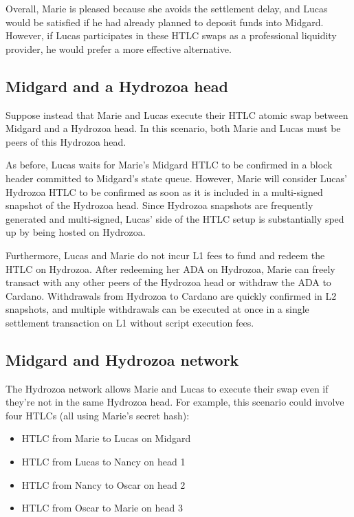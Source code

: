 \documentclass[11pt,a4paper,oneside]{article}
\begin{document}
\begin{multicols}{2}
Overall, Marie is pleased because she avoids the settlement delay, and Lucas would be satisfied if he had already planned to deposit funds into Midgard.
However, if Lucas participates in these HTLC swaps as a professional liquidity provider, he would prefer a more effective alternative.

\subsection{Midgard and a Hydrozoa head}%
\label{h:midgard-and-hydrozoa-head}

Suppose instead that Marie and Lucas execute their HTLC atomic swap between Midgard and a Hydrozoa head.
In this scenario, both Marie and Lucas must be peers of this Hydrozoa head.

As before, Lucas waits for Marie's Midgard HTLC to be confirmed in a block header committed to Midgard's state queue.
However, Marie will consider Lucas' Hydrozoa HTLC to be confirmed as soon as it is included in a multi-signed snapshot of the Hydrozoa head.
Since Hydrozoa snapshots are frequently generated and multi-signed, Lucas' side of the HTLC setup is substantially sped up by being hosted on Hydrozoa.

Furthermore, Lucas and Marie do not incur L1 fees to fund and redeem the HTLC on Hydrozoa.
After redeeming her ADA on Hydrozoa, Marie can freely transact with any other peers of the Hydrozoa head or withdraw the ADA to Cardano.
Withdrawals from Hydrozoa to Cardano are quickly confirmed in L2 snapshots, and multiple withdrawals can be executed at once in a single settlement transaction on L1 without script execution fees.

\subsection{Midgard and Hydrozoa network}%
\label{h:midgard-and-hydrozoa-network}

The Hydrozoa network allows Marie and Lucas to execute their swap even if they're not in the same Hydrozoa head.
For example, this scenario could involve four HTLCs (all using Marie's secret hash):
\begin{itemize}
  \item HTLC from Marie to Lucas on Midgard
  \item HTLC from Lucas to Nancy on head 1
  \item HTLC from Nancy to Oscar on head 2
  \item HTLC from Oscar to Marie on head 3
\end{itemize}


\end{multicols}
\end{document}
